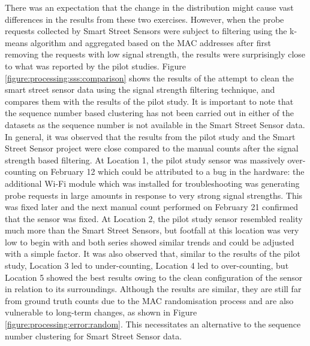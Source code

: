 There was an expectation that the change in the distribution might cause vast differences in the results from these two exercises.
However, when the probe requests collected by Smart Street Sensors were subject to filtering using the k-means algorithm and aggregated based on the MAC addresses after first removing the requests with low signal strength, the results were surprisingly close to what was reported by the pilot studies.
Figure \ref{figure:processing:sss:comparison} shows the results of the attempt to clean the smart street sensor data using the signal strength filtering technique, and compares them with the results of the pilot study.
It is important to note that the sequence number based clustering has not been carried out in either of the datasets as the sequence number is not available in the Smart Street Sensor data.
In general, it was observed that the results from the pilot study and the Smart Street Sensor project were close compared to the manual counts after the signal strength based filtering.
At Location 1, the pilot study sensor was massively over-counting on February 12 which could be attributed to a bug in the hardware: the additional Wi-Fi module which was installed for troubleshooting was generating probe requests in large amounts in response to very strong signal strengths.
This was fixed later and the next manual count performed on February 21 confirmed that the sensor was fixed.
At Location 2, the pilot study sensor resembled reality much more than the Smart Street Sensors, but footfall at this location was very low to begin with and both series showed similar trends and could be adjusted with a simple factor.
It was also observed that, similar to the results of the pilot study, Location 3 led to under-counting, Location 4 led to over-counting, but Location 5 showed the best results owing to the clean configuration of the sensor in relation to its surroundings.
Although the results are similar, they are still far from ground truth counts due to the MAC randomisation process and are also vulnerable to long-term changes, as shown in Figure \ref{figure:processing:error:random}.
This necessitates an alternative to the sequence number clustering for Smart Street Sensor data.

